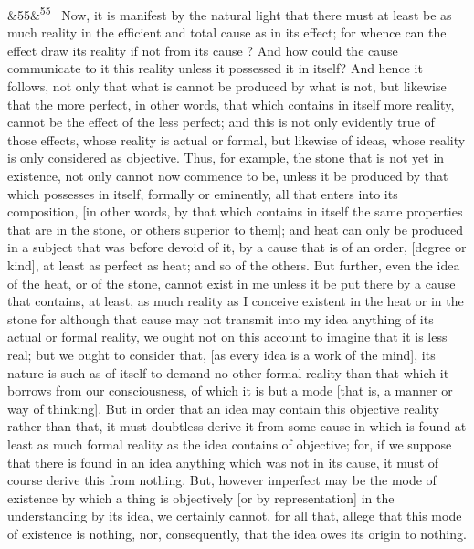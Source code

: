 \documentclass[12pt]{article}
\newcommand{\para}[1][]{\par\noindent\ifx&#1&\else\textsuperscript{\footnotesize #1}~\fi}
\begin{document}
\para[55] Now, it is manifest by the natural light that there must at least be as much reality in the efficient and total cause as in its effect; for whence can the effect draw its reality if not from its cause ? And how could the cause communicate to it this reality unless it possessed it in itself? And hence it follows, not only that what is cannot be produced by what is not, but likewise that the more perfect, in other words, that which contains in itself more reality, cannot be the effect of the less perfect; and this is not only evidently true of those effects, whose reality is actual or formal, but likewise of ideas, whose reality is only considered as objective. Thus, for example, the stone that is not yet in existence, not only cannot now commence to be, unless it be produced by that which possesses in itself, formally or eminently, all that enters into its composition, [in other words, by that which contains in itself the same properties that are in the stone, or others superior to them]; and heat can only be produced in a subject that was before devoid of it, by a cause that is of an order, [degree or kind], at least as perfect as heat; and so of the others. But further, even the idea of the heat, or of the stone, cannot exist in me unless it be put there by a cause that contains, at least, as much reality as I conceive existent in the heat or in the stone for although that cause may not transmit into my idea anything of its actual or formal reality, we ought not on this account to imagine that it is less real; but we ought to consider that, [as every idea is a work of the mind], its nature is such as of itself to demand no other formal reality than that which it borrows from our consciousness, of which it is but a mode [that is, a manner or way of thinking]. But in order that an idea may contain this objective reality rather than that, it must doubtless derive it from some cause in which is found at least as much formal reality as the idea contains of objective; for, if we suppose that there is found in an idea anything which was not in its cause, it must of course derive this from nothing. But, however imperfect may be the mode of existence by which a thing is objectively [or by representation] in the understanding by its idea, we certainly cannot, for all that, allege that this mode of existence is nothing, nor, consequently, that the idea owes its origin to nothing.
\end{document}
